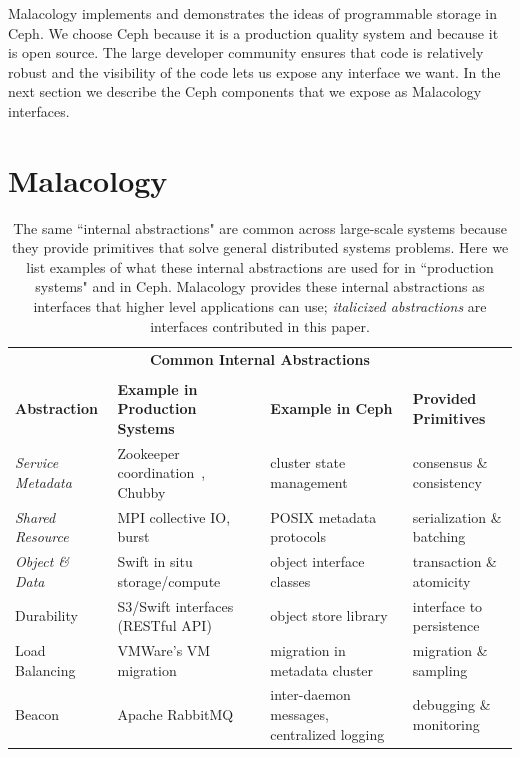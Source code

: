 \documentclass[preprint]{sigplanconf-eurosys}
\begin{document}
Malacology implements and demonstrates the ideas of programmable storage in
Ceph. We choose Ceph because it is a production quality system and because it
is open source. The large developer community ensures that code is relatively
robust and the visibility of the code lets us expose any interface we want. In
the next section we describe the Ceph components that we expose as Malacology
interfaces.

\section{Malacology}
\label{sec:malacology}

\begin{table}
\centering
\begin{tabular}{  l | l | l | l }
\multicolumn{4}{c}{\Large \textbf{Common Internal Abstractions}} \\
\multicolumn{4}{c}{} \\
\textbf{Abstraction}                    &
\textbf{Example in Production Systems}  &
\textbf{Example in Ceph}                &
\textbf{Provided Primitives}            \\ \hline
{\it Service Metadata}
  & Zookeeper coordination~\cite{hunt_zookeeper_2010}, Chubby~\cite{website:chubby}
  & cluster state management~\cite{website:ceph-mon}
  & consensus \& consistency
  \\
{\it Shared Resource}
  & MPI collective IO, burst
  & POSIX metadata protocols~\cite{CITEME}
  & serialization \& batching
  \\
{\it Object \& Data}
  & Swift in situ storage/compute~\cite{website:zerocloud}
  & object interface classes~\cite{website:cls-lua}
  & transaction \& atomicity
  \\
Durability
  & S3/Swift interfaces (RESTful API)
  & object store library~\cite{weil_rados_2007}
  & interface to persistence
  \\
Load Balancing
  & VMWare's VM migration~\cite{vmware-drs,gulati:hotcloud2011-cloud-resource-management} 
  & migration in metadata cluster~\cite{weil:sc2004-dyn-metadata}
  & migration \& sampling
  \\
Beacon
  & Apache RabbitMQ~\cite{CITEME}
  & inter-daemon messages, centralized logging
  & debugging \& monitoring
  \\
\end{tabular}
\caption{The same ``internal abstractions" are common across large-scale
systems because they provide primitives that solve general distributed systems
problems.  Here we list examples of what these internal abstractions are used
for in ``production systems" and in Ceph.  Malacology provides these internal
abstractions as interfaces that higher level applications can use; {\it
italicized abstractions} are interfaces contributed in this paper.}
\label{table:examples}
\end{table}
\end{document}
